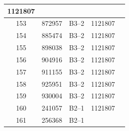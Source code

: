 \documentclass[UTF8,10pt,a4paper,fontset=fandol]{ctexart}
\newcommand{\fieldvalue}[1]{#1}
\begin{document}
\begin{center}
\begin{tabular}{|c|c|c|c|p{3.5cm}|}
\fieldvalue{1121807} & \\ \hline
153 &
\fieldvalue{872957} &
\fieldvalue{B3--2} &
\fieldvalue{1121807} & \\ \hline
154 &
\fieldvalue{885474} &
\fieldvalue{B3--2} &
\fieldvalue{1121807} & \\ \hline
155 &
\fieldvalue{898038} &
\fieldvalue{B3--2} &
\fieldvalue{1121807} & \\ \hline
156 &
\fieldvalue{904916} &
\fieldvalue{B3--2} &
\fieldvalue{1121807} & \\ \hline
157 &
\fieldvalue{911155} &
\fieldvalue{B3--2} &
\fieldvalue{1121807} & \\ \hline
158 &
\fieldvalue{925951} &
\fieldvalue{B3--2} &
\fieldvalue{1121807} & \\ \hline
159 &
\fieldvalue{930004} &
\fieldvalue{B3--2} &
\fieldvalue{1121807} & \\ \hline
160 &
\fieldvalue{241057} &
\fieldvalue{B2--1} &
\fieldvalue{1121807} & \\ \hline
161 &
\fieldvalue{256368} &
\fieldvalue{B2--1} &

\end{tabular}
\end{center}
\end{document}
